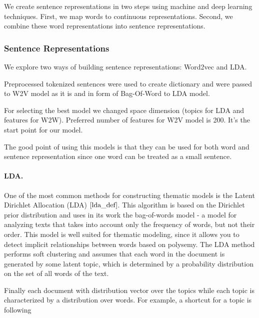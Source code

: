 \documentclass[11pt]{article}
\begin{document}
We create sentence representations in two steps using machine and deep learning techniques. First, we map words to continuous representations. Second, we combine these word representations into sentence representations. 

\subsubsection{Sentence Representations}

We explore two ways of building sentence representations: Word2vec and LDA.

Preprocessed tokenized sentences were used to create dictionary and were passed to W2V model as it is and in form of Bag-Of-Word to LDA model.

For selecting the best model we changed space dimension (topics for LDA and features for W2W). Preferred number of features for W2V model is 200. It's the start point for our model.

The good point of using this models is that they can be used for both word and sentence representation since one word can be treated as a small sentence.

\paragraph{LDA.}


One of the most common methods for constructing thematic models is the Latent Dirichlet Allocation (LDA) $\cite{lda_def}$. This algorithm is based on the Dirichlet prior distribution and uses in its work the bag-of-words model - a model for analyzing texts that takes into account only the frequency of words, but not their order. This model is well suited for thematic modeling, since it allows you to detect implicit relationships between words based on polysemy. The LDA method performs soft clustering and assumes that each word in the document is generated by some latent topic, which is determined by a probability distribution on the set of all words of the text.

Finally each document with distribution vector over the topics while each topic is characterized by a distribution over words. For example, a shortcut for a topic is following
\end{document}
